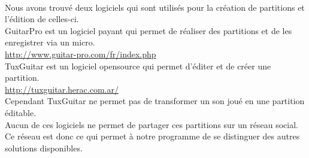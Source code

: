 \paragraph{}
	Nous avons trouvé deux logiciels qui sont utilisés pour la création de partitions et l'édition de celles-ci. \\
	GuitarPro est un logiciel payant qui permet de réaliser des partitions et de les enregistrer via un micro. \\
	\url{http://www.guitar-pro.com/fr/index.php} \\
	TuxGuitar est un logiciel opensource qui permet d'éditer et de créer une partition. \\
	\url{http://tuxguitar.herac.com.ar/}\\
	Cependant TuxGuitar ne permet pas de transformer un son joué en une partition éditable.\\
	Aucun de ces logiciels ne permet de partager ces partitions sur un réseau social.\\ 
	Ce réseau est donc ce qui permet à notre programme de se distinguer des autres solutions disponibles.\\

